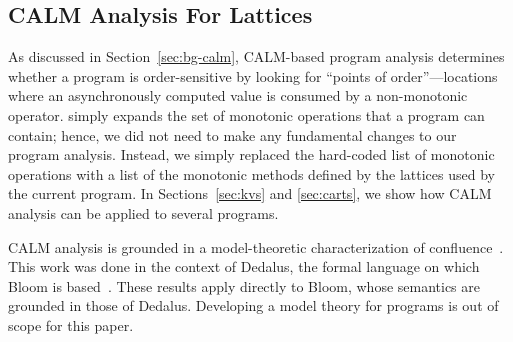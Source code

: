

\subsection{CALM Analysis For Lattices}
\label{sec:calmL}

As discussed in Section~\ref{sec:bg-calm}, CALM-based program analysis
determines whether a program is order-sensitive by looking for ``points of
order''---locations where an asynchronously computed value is consumed by a
non-monotonic operator. \lang simply expands the set of monotonic operations
that a program can contain; hence, we did not need to make any fundamental
changes to our program analysis. Instead, we simply replaced the hard-coded list
of monotonic operations with a list of the monotonic methods defined by the
lattices used by the current program. In Sections~\ref{sec:kvs} and
\ref{sec:carts}, we show how CALM analysis can be applied to several \lang programs.

CALM analysis is grounded in a model-theoretic characterization of
confluence~\cite{dedalus-confluence}. This work was done in the context of
Dedalus, the formal language on which Bloom is based~\cite{dedalus}.  These
results apply directly to Bloom, whose semantics are grounded in those of
Dedalus. Developing a model theory for \lang programs is out of scope for this
paper.

